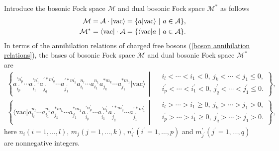 \documentclass[11pt,reqno]{amsart}
\numberwithin{equation}{section}
\begin{document}
Introduce the bosonic Fock space $\mathcal{M}$ and dual bosonic Fock space $\mathcal{M}^{\ast}$ as follows
\begin{eqnarray}
&&\mathcal{M}=\mathcal{A}\cdot|\text{vac}\rangle=\{a|\text{vac}
\rangle\ |\ a\in\mathcal{A}\},\notag\\
&&\mathcal{M}^{\ast}=\langle\text{vac}|\cdot\mathcal{A}=\{\langle\text{vac}
|a\ |\ a\in\mathcal{A}\}.
\end{eqnarray}
In terms of the annihilation relations of charged free bosons (\ref{boson annihilation relations}), the bases of bosonic Fock space $\mathcal{M}$ and dual bosonic Fock space $\mathcal{M}^{\ast}$ are
\begin{align}
\left\{a^{\prime n^{\prime}_{p}}_{i_{p}^{\prime}}
\cdots a^{\prime n^{\prime}_{1}}_{i_{1}^{\prime}}a^{\prime\ast m^{\prime}_{q}}_{j_{q}^{\prime}}
\cdots a^{\prime\ast m^{\prime}_{1}}_{j_{1}^{\prime}}a^{n_{l}}_{i_{l}}\cdots a^{n_{1}}_{i_{1}}
a^{\ast m_{k}}_{j_{k}}\cdots a^{\ast m_{1}}_{j_{1}}|\text{vac}\rangle\,\middle|\, %
    \begin{aligned}
        & i_{l} < \cdots < i_{1} < 0,\ j_{k} < \cdots < j_{1} \leq 0, \\
        & i^{\prime}_{p} < \cdots < i^{\prime}_{1} < 0,\ j^{\prime}_{q} < \cdots < j^{\prime}_{1} \leq 0.
    \end{aligned}\right\},
\end{align}
\begin{align}
\left\{\langle\text{vac}|a^{n_{l}}_{i_{l}}\cdots a^{n_{1}}_{i_{1}}
a^{\ast m_{k}}_{j_{k}}\cdots a^{\ast m_{1}}_{j_{1}}a^{\prime n^{\prime}_{p}}_{i_{p}^{\prime}}
\cdots a^{\prime n^{\prime}_{1}}_{i_{1}^{\prime}} a^{\prime\ast m^{\prime}_{q}}_{j_{q}^{\prime}}
\cdots a^{\prime\ast m^{\prime}_{1}}_{j_{1}^{\prime}}\,\middle|\, %
    \begin{aligned}
        & i_{l} > \cdots > i_{1} \geq 0,\ j_{k} > \cdots > j_{1} > 0, \\
        & i^{\prime}_{p} > \cdots > i^{\prime}_{1} \geq 0,\ j^{\prime}_{q} > \cdots > j^{\prime}_{1} > 0.
    \end{aligned}\right\},
\end{align}
here $n_i(i=1,\ldots,l)$, $m_{j}(j=1,\ldots,k)$, $n^{\prime}_{i^{\prime}}(i^{\prime}=1,\ldots,p)$ and $m^{\prime}_{j^{\prime}}(j^{\prime}=1,\ldots,q)$ are nonnegative integers.
\end{document}
